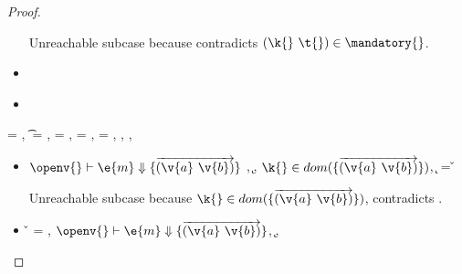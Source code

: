 \begin{lemma}
\begin{proof}
\begin{case}[T-GetHMap]
\begin{itemize}
\begin{subcase}[B-GetMissing]
       Unreachable subcase because 
       contradicts ${\inmandatory{\k{}}{\t{}}{\mandatory{}}}$.
      \end{subcase}
    \item[]
      \begin{subcase}[BE-Get1]
      \end{subcase}
    \item[]
      \begin{subcase}[BE-Get2]
      \end{subcase}
  \end{itemize}
\end{case}

\begin{case}[T-GetHMapAbsent]
  \e{} = { {}},
  \t{} = \Nil,
  \thenprop{\prop{}} = {\topprop{}},
  \elseprop{\prop{}} = {\topprop{}},
  \object{} = {\replacefor
               { {\x{}}}
                          {}
                          {\x{}}},
  \judgementtwo {\propenv{}} { {}},
  \judgement {\propenv{}} { {\HMapgeneric {\mandatory{}} {\absent}}}
           { {}}
           {},
  {\inabsent{\k{}}{\absent{}}}


  \begin{itemize}
    \item[]
      \begin{subcase}[B-Get]
        $\opsem {\openv{}}
        {\e{m}} {\curlymap{\overrightarrow{({\v{a}}\ {\v{b}})}}}$
        ,
         \opsem {\openv{}} {} {\k{}},
         $\keyinmap{\k{}}{\curlymap{\overrightarrow{({\v{a}}\ {\v{b}})}}}$,
          {\k{}} = {\v{}}

       Unreachable subcase because 
         $\keyinmap{\k{}}{\curlymap{\overrightarrow{({\v{a}}\ {\v{b}})}}}$,
         contradicts
                {\inabsent{\k{}}{\absent{}}}.
      \end{subcase}
    \item[]
      \begin{subcase}[B-GetMissing]
        \v{} = \nil,
        $\opsem {\openv{}}
        {\e{m}} {\curlymap{\overrightarrow{({\v{a}}\ {\v{b}})}}}$,
       \opsem {\openv{}} {} {\k{}},


\end{subcase}
\end{itemize}
\end{case}
\end{proof}
\end{lemma}
